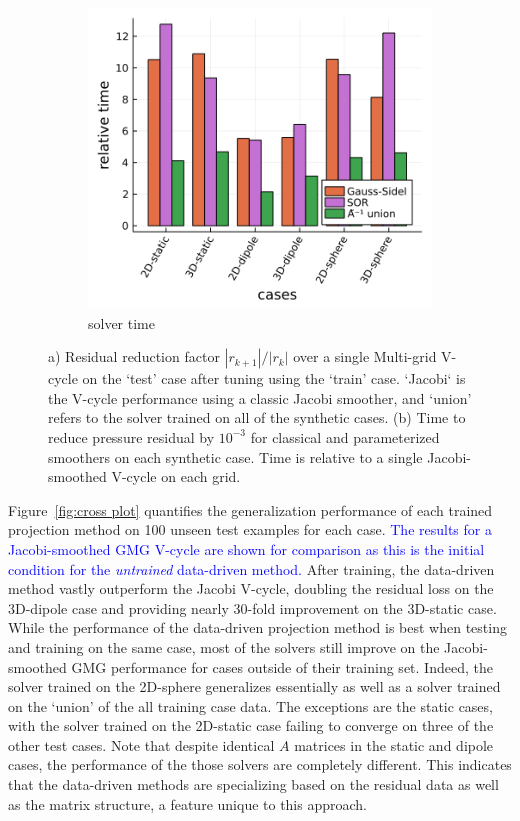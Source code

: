 \documentclass[review]{elsarticle}
\begin{document}
\begin{figure}
\begin{subfigure}[b]{0.47\textwidth}
        \includegraphics[width=\textwidth]{figures/synthetic_timing.png}
        \caption{solver time}
        \label{fig:synthetic time}
    \end{subfigure}
    \caption{a) Residual reduction factor $|r_{k+1}|/|r_k|$ over a single Multi-grid V-cycle on the `test' case after tuning using the `train' case. `Jacobi` is the V-cycle performance using a classic Jacobi smoother, and `union' refers to the solver trained on all of the synthetic cases. (b) Time to reduce pressure residual by $10^{-3}$ for classical and parameterized smoothers on each synthetic case. Time is relative to a single Jacobi-smoothed V-cycle on each grid.}
    \label{fig:synthetic results}
\end{figure}

Figure~\ref{fig:cross plot} quantifies the generalization performance of each trained projection method on 100 unseen test examples for each case. \textcolor{blue}{The results for a Jacobi-smoothed GMG V-cycle are shown for comparison as this is the initial condition for the \textit{untrained} data-driven method.} After training, the data-driven method vastly outperform the Jacobi V-cycle, doubling the residual loss on the 3D-dipole case and providing nearly 30-fold improvement on the 3D-static case. While the performance of the data-driven projection method is best when testing and training on the same case, most of the solvers still improve on the Jacobi-smoothed GMG performance for cases outside of their training set. Indeed, the solver trained on the 2D-sphere generalizes essentially as well as a solver trained on the `union' of the all training case data. The exceptions are the static cases, with the solver trained on the 2D-static case failing to converge on three of the other test cases. Note that despite identical $A$ matrices in the static and dipole cases, the performance of the those solvers are completely different. This indicates that the data-driven methods are specializing based on the residual data as well as the matrix structure, a feature unique to this approach.
\end{document}

